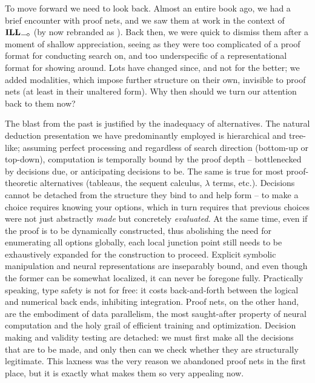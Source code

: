 To move forward we need to look back.
Almost an entire book ago, we had a brief encounter with proof nets, and we saw them at work in the context of $\ILL_{\li}$ (by now rebranded as \NLP).
Back then, we were quick to dismiss them after a moment of shallow appreciation, seeing as they were too complicated of a proof format for conducting search on, and too underspecific of a representational format for showing around.
Lots have changed since, and not for the better; we added modalities, which impose further structure on their own, invisible to proof nets (at least in their unaltered form).
Why then should we turn our attention back to them now?

The blast from the past is justified by the inadequacy of alternatives.
The natural deduction presentation we have predominantly employed is hierarchical and tree-like; assuming perfect processing and regardless of search direction (bottom-up or top-down), computation is temporally bound by the proof depth -- bottlenecked by decisions due, or anticipating decisions to be.
The same is true for most proof-theoretic alternatives (tableaus, the sequent calculus, $\lambda$ terms, etc.).
Decisions cannot be detached from the structure they bind to and help form -- to make a choice requires knowing your options, which in turn requires that previous choices were not just abstractly \textit{made} but concretely \textit{evaluated}.
At the same time, even if the proof is to be dynamically constructed, thus abolishing the need for enumerating all options globally, each local junction point still needs to be exhaustively expanded for the construction to proceed.
Explicit symbolic manipulation and neural representations are inseparably bound, and even though the former can be somewhat localized, it can never be foregone fully.
Practically speaking, type safety is not for free: it costs back-and-forth between the logical and numerical back ends, inhibiting integration.
Proof nets, on the other hand, are the embodiment of data parallelism, the most saught-after property of neural computation and the holy grail of efficient training and optimization.
Decision making and validity testing are detached: we must first make all the decisions that are to be made, and only then can we check whether they are structurally legitimate.
This laxness was the very reason we abandoned proof nets in the first place, but it is exactly what makes them so very appealing now.

